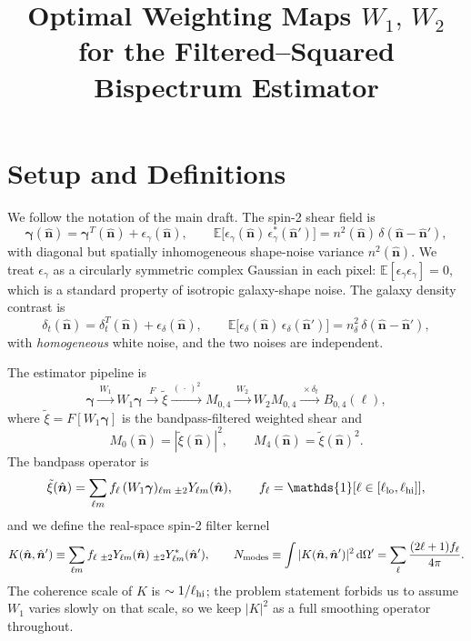 \documentclass[11pt]{article}
\title{Optimal Weighting Maps $W_1,\,W_2$ for the Filtered--Squared Bispectrum Estimator}
\author{}
\date{}
\newcommand{\shear}{\boldsymbol{\gamma}}
\newcommand{\nv}{\hat{\boldsymbol{n}}}
\newcommand{\dom}{\mathrm{d}\Omega}
\newcommand{\E}{\mathbb{E}}
\newcommand{\deltat}{\delta_t}
\newcommand{\Nmodes}{N_{\rm modes}}
\newcommand{\Wone}{W_1}
\newcommand{\Wtwo}{W_2}
\begin{document}
\maketitle

\section{Setup and Definitions}

We follow the notation of the main draft. The spin-2 shear field is
\begin{equation}
\shear(\nv)=\shear^T(\nv)+\epsilon_\gamma(\nv),\qquad
\E\bigl[\epsilon_\gamma(\nv)\,\epsilon_\gamma^*(\nv')\bigr]=n^2(\nv)\,\delta(\nv-\nv'),
\label{eq:gamma}
\end{equation}
with diagonal but spatially inhomogeneous shape-noise variance $n^2(\nv)$. We
treat $\epsilon_\gamma$ as a circularly symmetric complex Gaussian in each pixel:
$\E[\epsilon_\gamma\epsilon_\gamma]=0$, which is a standard property of
isotropic galaxy-shape noise. The galaxy density contrast is
\begin{equation}
\deltat(\nv)=\deltat^T(\nv)+\epsilon_\delta(\nv),\qquad
\E\bigl[\epsilon_\delta(\nv)\,\epsilon_\delta(\nv')\bigr]=n_\delta^2\,\delta(\nv-\nv'),
\label{eq:delta}
\end{equation}
with \emph{homogeneous} white noise, and the two noises are independent.

The estimator pipeline is
\begin{equation}
\shear\xrightarrow{\,\Wone\,}\Wone\shear
\xrightarrow{\,F\,}\tilde\xi
\xrightarrow{\,(\,\cdot\,)^2\,}M_{0,4}
\xrightarrow{\,\Wtwo\,}\Wtwo M_{0,4}
\xrightarrow{\,\times\deltat\,}\hat B_{0,4}(\ell),
\end{equation}
where $\tilde\xi=F[\Wone\shear]$ is the bandpass-filtered weighted shear and
\begin{equation}
M_0(\nv)=|\tilde\xi(\nv)|^2,\qquad M_4(\nv)=\tilde\xi(\nv)^2.
\end{equation}
The bandpass operator is
\begin{equation}
\tilde\xi(\nv)=\sum_{\ell m}f_\ell\,(\Wone\shear)_{\ell m}\,{}_{\pm2}Y_{\ell m}(\nv),
\qquad
f_\ell=\mathds{1}[\ell\in[\ell_{\rm lo},\ell_{\rm hi}]],
\end{equation}
and we define the real-space spin-2 filter kernel
\begin{equation}
K(\nv,\nv')\equiv\sum_{\ell m}f_\ell\;{}_{\pm2}Y_{\ell m}(\nv)\;{}_{\pm2}Y_{\ell m}^*(\nv'),
\qquad
\Nmodes\equiv\int|K(\nv,\nv')|^2\,\dom'=\sum_\ell\frac{(2\ell+1)f_\ell}{4\pi}.
\label{eq:kernel}
\end{equation}
The coherence scale of $K$ is $\sim 1/\ell_{\rm hi}$; the problem statement
forbids us to assume $\Wone$ varies slowly on that scale, so we keep
$|K|^2$ as a full smoothing operator throughout.
\end{document}
